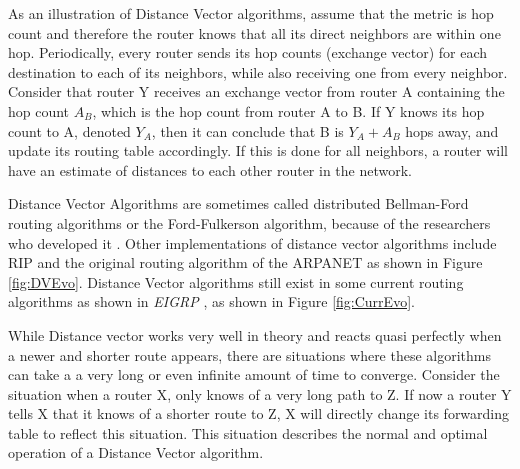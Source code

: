 
As an illustration of Distance Vector algorithms, assume that the metric is hop count and therefore the router knows that all its direct neighbors are within one hop. Periodically, every router sends its hop counts (exchange vector) for each destination to each of its neighbors, while also receiving one from every neighbor. Consider that router Y receives an exchange vector from router A containing the hop count $A_B$, which is the hop count from router A to B. If Y knows its hop count to A, denoted $Y_A$, then it can conclude that B is $Y_A + A_B$ hops away, and update its routing table accordingly. If this is done for all neighbors, a router will have an estimate of distances to each other router in the network.

Distance Vector Algorithms are sometimes called distributed Bellman-Ford routing algorithms or the Ford-Fulkerson algorithm, because of the researchers who developed it \cite{Bellman1958, Ford1956}. Other implementations of distance vector algorithms include RIP \cite{RIP} and the original routing algorithm of the ARPANET \cite{ARPAORIG} as shown in Figure \ref{fig:DVEvo}. Distance Vector algorithms still exist in some current routing algorithms as shown in \textit{EIGRP} \cite{EIGRP}, as shown in Figure \ref{fig:CurrEvo}.


While Distance vector works very well in theory and reacts quasi perfectly when a newer and shorter route appears, there are situations where these algorithms can take a a very long or even infinite amount of time to converge. Consider the situation when a router X, only knows of a very long path to Z. If now a router Y tells X that it knows of a shorter route to Z, X will directly change its forwarding table to reflect this situation. This situation describes the normal and optimal operation of a Distance Vector algorithm.  

